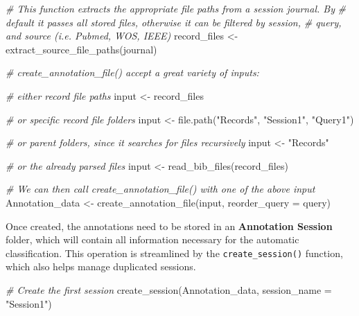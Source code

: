 \documentclass[
]{article}
\newenvironment{Shaded}{\begin{snugshade}}{\end{snugshade}}
\newcommand{\AttributeTok}[1]{\textcolor[rgb]{0.77,0.63,0.00}{#1}}
\newcommand{\CommentTok}[1]{\textcolor[rgb]{0.56,0.35,0.01}{\textit{#1}}}
\newcommand{\FunctionTok}[1]{\textcolor[rgb]{0.00,0.00,0.00}{#1}}
\newcommand{\NormalTok}[1]{#1}
\newcommand{\OtherTok}[1]{\textcolor[rgb]{0.56,0.35,0.01}{#1}}
\newcommand{\StringTok}[1]{\textcolor[rgb]{0.31,0.60,0.02}{#1}}
\begin{document}
\begin{Shaded}
\begin{Highlighting}[]
\CommentTok{\# This function extracts the appropriate file paths from a session journal. By}
\CommentTok{\# default it passes all stored files, otherwise it can be filtered by session,}
\CommentTok{\# query, and source (i.e. Pubmed, WOS, IEEE)}
\NormalTok{record\_files }\OtherTok{\textless{}{-}} \FunctionTok{extract\_source\_file\_paths}\NormalTok{(journal)}

\CommentTok{\# create\_annotation\_file() accept a great variety of inputs:}

\CommentTok{\# either record file paths}
\NormalTok{input }\OtherTok{\textless{}{-}}\NormalTok{ record\_files}

\CommentTok{\# or specific record file folders}
\NormalTok{input }\OtherTok{\textless{}{-}} \FunctionTok{file.path}\NormalTok{(}\StringTok{"Records"}\NormalTok{, }\StringTok{"Session1"}\NormalTok{, }\StringTok{"Query1"}\NormalTok{)}

\CommentTok{\# or parent folders, since it searches for files recursively}
\NormalTok{input }\OtherTok{\textless{}{-}} \StringTok{"Records"}

\CommentTok{\# or the already parsed files}
\NormalTok{input }\OtherTok{\textless{}{-}} \FunctionTok{read\_bib\_files}\NormalTok{(record\_files)}

\CommentTok{\# We can then call create\_annotation\_file() with one of the above input}
\NormalTok{Annotation\_data }\OtherTok{\textless{}{-}} \FunctionTok{create\_annotation\_file}\NormalTok{(input, }\AttributeTok{reorder\_query =}\NormalTok{ query)}
\end{Highlighting}
\end{Shaded}

Once created, the annotations need to be stored in an \textbf{Annotation
Session} folder, which will contain all information necessary for the
automatic classification. This operation is streamlined by the
\texttt{create\_session()} function, which also helps manage duplicated
sessions.

\begin{Shaded}
\begin{Highlighting}[]
\CommentTok{\# Create the first session}
\FunctionTok{create\_session}\NormalTok{(Annotation\_data, }\AttributeTok{session\_name =} \StringTok{"Session1"}\NormalTok{)}
\end{Highlighting}
\end{Shaded}
\end{document}
